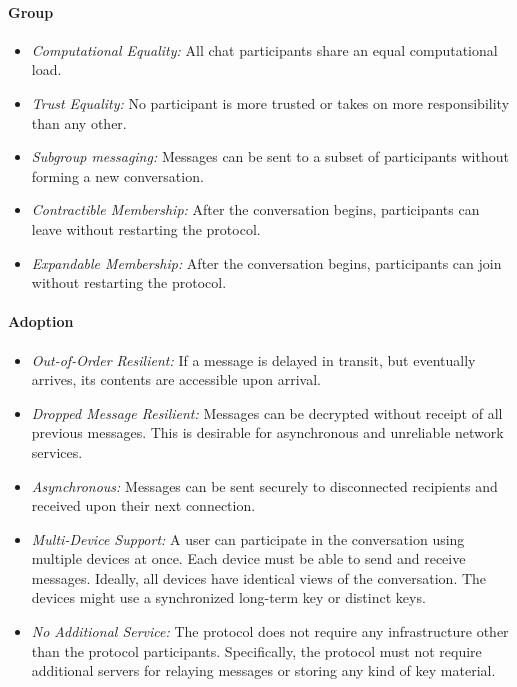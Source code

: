 \paragraph{Group}

\begin{itemize}
	\item \emph{Computational Equality:} All chat participants share an equal computational load.
	\item \emph{Trust Equality:} No participant is more trusted or takes on more responsibility than any other.
	\item \emph{Subgroup messaging:} Messages can be sent to a subset of participants without forming a new conversation.
	\item \emph{Contractible Membership:} After the conversation begins, participants can leave without restarting the protocol.
	\item \emph{Expandable Membership:} After the conversation begins, participants can join without restarting the protocol.
\end{itemize}






\paragraph{Adoption}

\begin{itemize}
	\item \emph{Out-of-Order Resilient:} If a message is delayed in transit, but eventually arrives, its contents are accessible upon arrival.
	\item \emph{Dropped Message Resilient:} Messages can be decrypted without receipt of all previous messages. This is desirable for asynchronous and unreliable network services.
	\item \emph{Asynchronous:} Messages can be sent securely to disconnected	recipients and received upon their next connection.
	\item \emph{Multi-Device Support:} A user can participate in the conversation using multiple devices at once. Each device must be able to send and receive messages. Ideally, all devices have identical views of the conversation. The devices might use a synchronized long-term key or distinct keys.
	\item \emph{No Additional Service:} The protocol does not require any infrastructure other than the protocol participants. Specifically, the protocol must not require additional servers for relaying	messages or storing any kind of key material.
\end{itemize}







